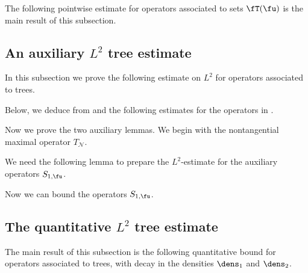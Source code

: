 The following pointwise estimate for operators associated to sets $\fT(\fu)$ is the main result of this subsection.













\subsection{An auxiliary \texorpdfstring{$L^2$}{L2} tree estimate}

In this subsection we prove the following estimate on $L^2$ for operators associated to trees.


Below, we deduce  from  and the following estimates for the operators in .





Now we prove the two auxiliary lemmas. We begin with the nontangential maximal operator $T_{\mathcal{N}}$.



We need the following lemma to prepare the $L^2$-estimate for the auxiliary operators $S_{1, \fu}$.




Now we can bound the operators $S_{1, \fu}$.



\subsection{The quantitative \texorpdfstring{$L^2$}{L2} tree estimate}

The main result of this subsection is the following quantitative bound for operators associated to trees, with decay in the densities $\dens_1$ and $\dens_2$.


